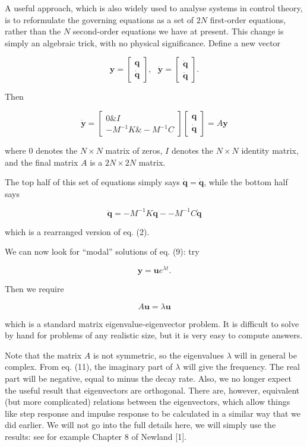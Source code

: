   A useful approach, which is also widely used to analyse systems in control 
  theory, is to reformulate the governing equations as a set of $2N$ 
  first-order equations, rather than the $N$ second-order equations we have at 
  present. This change is simply an algebraic trick, with no physical 
  significance. Define a new vector 

  $$\mathbf{y} = \begin{bmatrix}\mathbf{q}\\ 
  \dot{\mathbf{q}}\end{bmatrix},~~~\dot{\mathbf{y}} = 
  \begin{bmatrix}\dot{\mathbf{q}}\\\ddot{\mathbf{q}}\end{bmatrix} . \tag{8}$$ 

  Then 

  $$\dot{\mathbf{y}} = \begin{bmatrix}0 \& I\\ -M^{-1}K \& 
  -M^{-1}C\end{bmatrix} \begin{bmatrix}\mathbf{q}\\ 
  \dot{\mathbf{q}}\end{bmatrix} = A \mathbf{y} \tag{9}$$ 

  where $0$ denotes the $N \times N$ matrix of zeros, $I$ denotes the $N \times 
  N$ identity matrix, and the final matrix $A$ is a $2N \times 2N$ matrix. 

  The top half of this set of equations simply says 
  $\dot{\mathbf{q}}=\dot{\mathbf{q}}$, while the bottom half says 

  $$\ddot{\mathbf{q}} = -M^{-1} K \mathbf{q} -- M^{-1} C \dot{\mathbf{q}} 
  \tag{10}$$ 

  which is a rearranged version of eq. (2). 

  We can now look for ``modal'' solutions of eq. (9): try 

  $$\mathbf{y} = \mathbf{u} e^{\lambda t} . \tag{11}$$ 

  Then we require 

  $$A \mathbf{u} = \lambda \mathbf{u} \tag{12}$$ 

  which is a standard matrix eigenvalue-eigenvector problem. It is difficult to 
  solve by hand for problems of any realistic size, but it is very easy to 
  compute answers. 

  Note that the matrix $A$ is not symmetric, so the eigenvalues $\lambda$ will 
  in general be complex. From eq. (11), the imaginary part of $\lambda$ will 
  give the frequency. The real part will be negative, equal to minus the decay 
  rate. Also, we no longer expect the useful result that eigenvectors are 
  orthogonal. There are, however, equivalent (but more complicated) relations 
  between the eigenvectors, which allow things like step response and impulse 
  response to be calculated in a similar way that we did earlier. We will not 
  go into the full details here, we will simply use the results: see for 
  example Chapter 8 of Newland [1]. 

